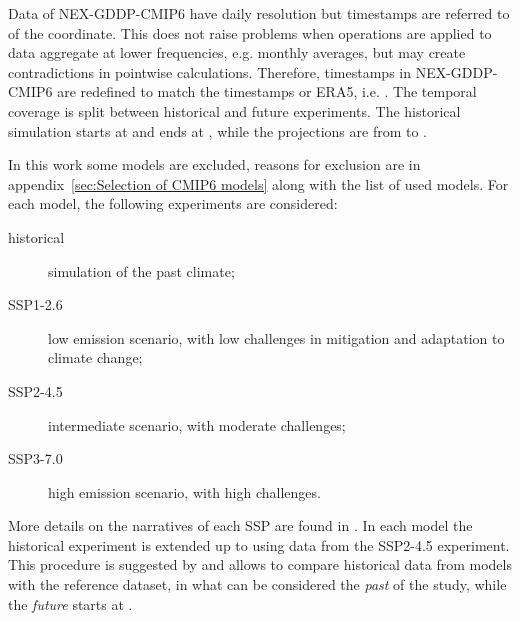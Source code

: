 Data of NEX-GDDP-CMIP6 have daily resolution but timestamps are referred to  of the coordinate. This does not raise problems when operations are applied to data aggregate at lower frequencies, e.g. monthly averages, but may create contradictions in pointwise calculations. Therefore, timestamps in NEX-GDDP-CMIP6 are redefined to match the timestamps or ERA5, i.e. .
The temporal coverage is split between historical and future experiments. The historical simulation starts at  and ends at , while the projections are from  to .

In this work some models are excluded, reasons for exclusion are in appendix~\ref{sec:Selection of CMIP6 models} along with the list of used models. For each model, the following experiments are considered:
\begin{description}
  \item[historical] simulation of the past climate;
  \item[SSP1-2.6] low emission scenario, with low challenges in mitigation and adaptation to climate change;
  \item[SSP2-4.5] intermediate scenario, with moderate challenges;
  \item[SSP3-7.0] high emission scenario, with high challenges.
\end{description}
More details on the narratives of each \gls{SSP} are found in \cite{2017ONeillTheRoads}.
In each model the historical experiment is extended up to  using data from the SSP2-4.5 experiment. This procedure is suggested by \cite[1954]{2016EyringOverviewOf} and allows to compare historical data from models with the reference dataset, in what can be considered the \emph{past} of the study, while the \emph{future} starts at .



